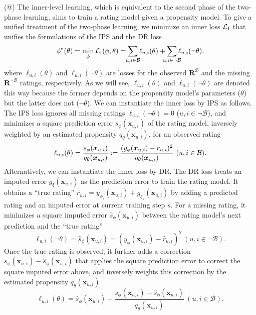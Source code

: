 \documentclass[letterpaper]{article} %
\makeatletter
\newcommand{\matrixize}[1]{\mathbf{#1}}
\newcommand{\vectorize}[1]{\bm{#1}}
\newcommand{\lrdense}[2]{\smashoperator[lr]{#1_{#2}}}
\newcommand{\defeq}{\vcentcolon=}
\newcommand{\obsBiasedPairs}{\mathcal{B}}
\newcommand{\misBiasedPairs}{{\lnot\mathcal{B}}}
\newcommand{\trueRatings}{\matrixize{R}}
\newcommand{\biasedRating}{r_{u,i}}
\newcommand{\imputedRating}{\hat{r}_{u,i}}
\newcommand{\featureMark}{x}
\newcommand{\biasedFeatures}{\vectorize{\featureMark}_{u,i}}
\newcommand{\loss}[1]{\mathcal{L}_{\rm #1}}
\newcommand{\obsLoss}{\ell}
\newcommand{\misLoss}{\ell}
\newcommand{\innerMark}{I}
\newcommand{\ratingName}{y}
\newcommand{\ratingParam}{\phi}
\newcommand{\ratingModel}{\ratingName_\ratingParam(\biasedFeatures)}
\newcommand{\errorName}{g}
\newcommand{\errorParam}{\xi}%
\newcommand{\lossName}{s}
\newcommand{\trueLoss}{\lossName_\ratingParam(\biasedFeatures)}
\newcommand{\imputedLoss}{\hat{\lossName}_\ratingParam(\biasedFeatures)}
\newcommand{\propensityName}{q}
\newcommand{\propensityParam}{\theta}
\newcommand{\propensityModel}{\propensityName_\propensityParam(\biasedFeatures)}
\newcommand{\step}{s}
\newcommand*{\myroman}[1]{\expandafter\@slowromancap\romannumeral #1@}
\makeatother
\begin{document}
(\myroman{1}) The inner-level learning, which is equivalent to the second phase of the two-phase learning, aims to train a rating model given a propensity model.
To give a unified treatment of the two-phase learning, we minimize an inner loss $\loss{\innerMark}$ that unifies the formulations of the IPS and the DR loss
\begin{equation}
\label{eqn:inner level learning}
\ratingParam^*(\propensityParam)
=\min_{\ratingParam}\loss{\innerMark}(\ratingParam,\propensityParam)
=\lrdense{\sum}{u,i\in\obsBiasedPairs}\obsLoss_{u,i}(\propensityParam)
+\lrdense{\sum}{u,i\in\misBiasedPairs}\misLoss_{u,i}(\lnot\propensityParam),
\end{equation}%
where $\obsLoss_{u,i}(\propensityParam)$ and $\misLoss_{u,i}(\lnot\propensityParam)$ are losses for the observed $\trueRatings^\obsBiasedPairs$ and the missing $\trueRatings^\misBiasedPairs$ ratings, respectively.
As we will see, $\obsLoss_{u,i}(\propensityParam)$ and $\misLoss_{u,i}(\lnot\propensityParam)$ are denoted this way because the former depends on the propensity model's parameters ($\propensityParam$) but the latter does not ($\lnot\propensityParam$).
We can instantiate the inner loss by IPS as follows.
The IPS loss ignores all missing ratings $\misLoss_{u,i}(\lnot\propensityParam)=0$ ($u,i\in\misBiasedPairs$), and minimizes a square prediction error $\trueLoss$ of the rating model, inversely weighted by an estimated propensity $\propensityModel$, for an observed rating
\begin{equation*}
\obsLoss_{u,i}(\propensityParam)
=\frac{\trueLoss}{\propensityModel}
\defeq\frac{(\ratingModel-\biasedRating)^2}{\propensityModel}
\ (u,i\in\obsBiasedPairs).
\end{equation*}%
Alternatively, we can instantiate the inner loss by DR.
The DR loss treats an imputed error $\errorName_{\errorParam}(\biasedFeatures)$ as the prediction error to train the rating model.
It obtains a ``true rating'' $\imputedRating=\ratingName_{\ratingParam_\step}(\biasedFeatures)+\errorName_{\errorParam_\step}(\biasedFeatures)$ by adding a predicted rating and an imputed error at current training step $\step$.
For a missing rating, it minimizes a square imputed error $\imputedLoss$ between the rating model's next prediction and the ``true rating''
\begin{equation*}
\misLoss_{u,i}(\lnot\propensityParam)
=\imputedLoss
=(\ratingModel-\imputedRating)^2
\ (u,i\in\misBiasedPairs).
\end{equation*}%
Once the true rating is observed, it further adds a correction $\trueLoss-\imputedLoss$ that applies the square prediction error to correct the square imputed error above, and inversely weights this correction by the estimated propensity $\propensityModel$
\begin{equation*}
\obsLoss_{u,i}(\propensityParam)
=\imputedLoss+\frac{\trueLoss-\imputedLoss}{\propensityModel}
\ (u,i\in\obsBiasedPairs).
\end{equation*}%
\end{document}
